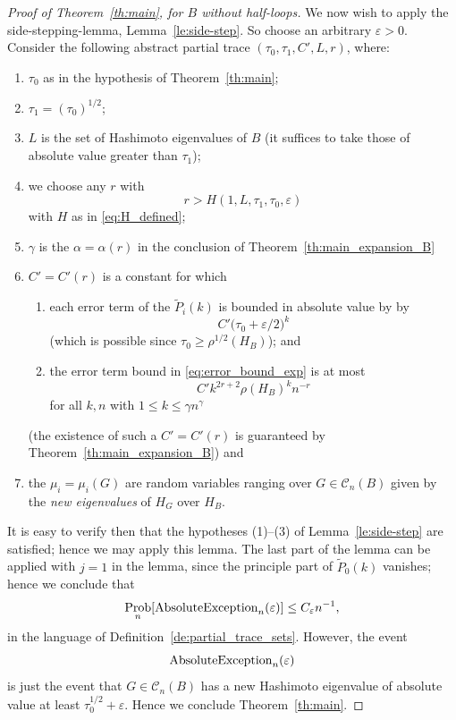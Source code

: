 \documentclass{memo-l}
\theoremstyle{plain}
\theoremstyle{definition}
\numberwithin{section}{chapter}
\numberwithin{equation}{chapter}
\newcommand{\rhoroot}[1]{\rho^{1/2}(H_{#1})}
\DeclareMathOperator{\Prob}{Prob}
\theoremstyle{plain}
\theoremstyle{definition}
\newcommand\cC{\mathcal{C}}
\begin{document}
\begin{proof}[Proof of Theorem~\ref{th:main}, for $B$ without
half-loops]
We now wish to apply the side-stepping-lemma,
Lemma~\ref{le:side-step}.
So choose an arbitrary $\varepsilon>0$.
Consider the following abstract partial trace $(\tau_0,\tau_1,C',L,r)$,
where: 
\begin{enumerate}
\item $\tau_0$ as in the hypothesis
of Theorem~\ref{th:main};
\item $\tau_1=(\tau_0)^{1/2}$;
\item $L$ is the set of Hashimoto eigenvalues of $B$ (it suffices
to take those of absolute 
value greater than $\tau_1$);
\item we choose any $r$ with
\begin{equation}\label{eq:how_big_is_r}
r>H(1,L,\tau_1,\tau_0,\varepsilon)
\end{equation}
with $H$ as in
\eqref{eq:H_defined};
\item $\gamma$ is the $\alpha=\alpha(r)$ in the conclusion of
Theorem~\ref{th:main_expansion_B}
\item $C'=C'(r)$ is a constant for which
\begin{enumerate}
\item each error term of the 
$\widetilde P_i(k)$ is bounded in absolute value by
by 
$$
C' \bigl(\tau_0+\varepsilon/2 \bigr)^k  
$$
(which is possible since $\tau_0\ge \rhoroot B$);
and
\item the
error term bound in \eqref{eq:error_bound_exp} is at most
$$
C' k^{2r+2} \rho(H_B)^k n^{-r}  
$$
for all $k,n$ with $1\le k\le \gamma n^\gamma$
\end{enumerate}
(the existence of such a $C'=C'(r)$ is guaranteed by
Theorem~\ref{th:main_expansion_B})
and
\item the $\mu_i=\mu_i(G)$ are random variables ranging over 
$G\in\cC_n(B)$ given by the {\em new eigenvalues} of 
$H_G$ over $H_B$.
\end{enumerate}
It is easy to verify then that the hypotheses (1)--(3) of
Lemma~\ref{le:side-step} are satisfied; hence we may apply this lemma.
The last part of the lemma can be applied with $j=1$ in the lemma,
since the principle part of $\widetilde P_0(k)$ vanishes; hence we 
conclude that
$$
\Prob_n[ {\rm AbsoluteException}_n(\varepsilon) ] \leq C_\varepsilon n^{-1} ,
$$
in the language of Definition~\ref{de:partial_trace_sets}.  However,
the event
$$
{\rm AbsoluteException}_n(\varepsilon)
$$
is just the event that $G\in\cC_n(B)$ has a new Hashimoto eigenvalue
of absolute value at least $\tau_0^{1/2}+\varepsilon$.
Hence we conclude Theorem~\ref{th:main}.

\end{proof}
% 
\end{document}
